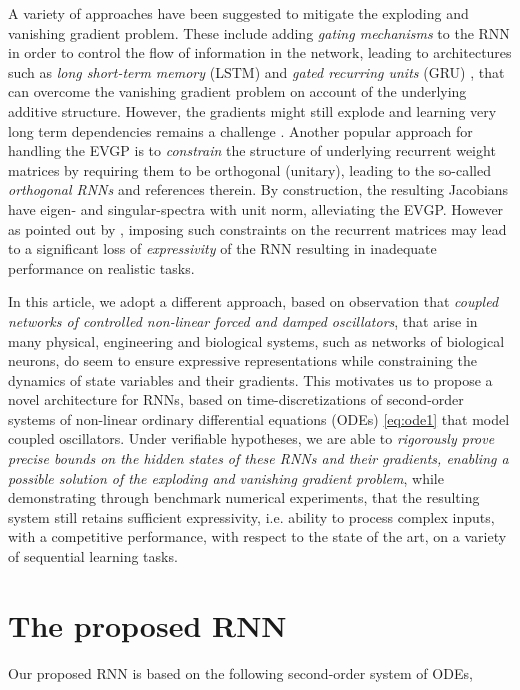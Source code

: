 \documentclass{article} \usepackage{iclr2021_conference,times}
\begin{document}
A variety of approaches have been suggested to mitigate the exploding and vanishing gradient problem. These include adding \emph{gating mechanisms} to the RNN in order to control the flow of information in the network, leading to architectures such as \emph{long short-term memory} (LSTM) \citep{lstm} and \emph{gated recurring units} (GRU) \citep{gru}, that can overcome the vanishing gradient problem on account of the underlying additive structure. However, the gradients might still explode and learning very long term dependencies remains a challenge \citep{indrnn}. Another popular approach for handling the EVGP is to \emph{constrain} the structure of underlying recurrent weight matrices by requiring them to be orthogonal (unitary), leading to the so-called \emph{orthogonal RNNs} \citep{orthornn,urnn,eurnn,nnRNN} and references therein. By construction, the resulting Jacobians have eigen- and singular-spectra with unit norm, alleviating the EVGP. However as pointed out by \cite{nnRNN}, imposing such constraints on the recurrent matrices may lead to a significant loss of \emph{expressivity} of the RNN resulting in inadequate performance on realistic tasks.

In this article, we adopt a different approach, based on observation that \emph{coupled networks of controlled non-linear forced and damped oscillators}, that arise in many physical, engineering and biological systems, such as networks of biological neurons, do seem to ensure expressive representations while constraining the dynamics of state variables and their gradients. This motivates us to propose a novel architecture for RNNs, based on time-discretizations of second-order systems of non-linear ordinary differential equations (ODEs) \eqref{eq:ode1} that model coupled oscillators. Under verifiable hypotheses, we are able to \emph{rigorously prove precise bounds on the hidden states of these RNNs and their gradients, enabling a possible solution of the exploding and vanishing gradient problem}, while demonstrating through benchmark numerical experiments, that the resulting system still retains sufficient expressivity, i.e. ability to process complex inputs, with a competitive performance, with respect to the state of the art, on a variety of sequential learning tasks.  


\section{The proposed RNN}
Our proposed RNN is based on the following second-order system of ODEs, 
\end{document}
